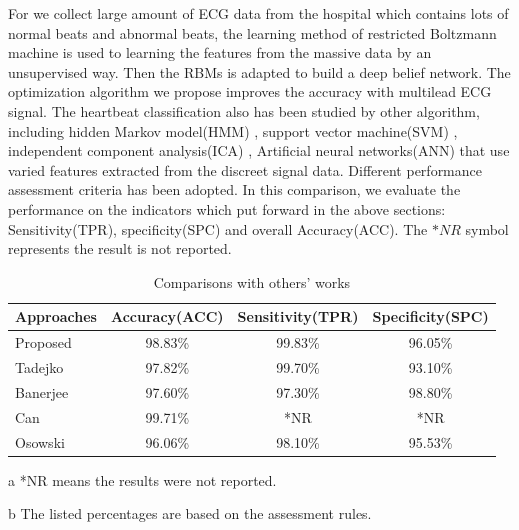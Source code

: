 \documentclass{bmcart}
\begin{document}
For we collect large amount of ECG data from the hospital which contains lots of normal beats and abnormal beats, the learning method of restricted Boltzmann machine is used to learning the features from the massive data by an unsupervised way. Then the RBMs is adapted to build a deep belief network. The optimization algorithm we propose improves the accuracy with multilead ECG signal. The heartbeat classification also has been studied by other algorithm, including hidden Markov model(HMM) \cite{Andreao}, support vector machine(SVM) \cite{Asl}\cite{Melgani}, independent component analysis(ICA) \cite{Sung}, Artificial neural networks(ANN) that use varied features extracted from the discreet signal data. Different performance assessment criteria has been adopted. In this comparison, we evaluate the performance on the indicators which put forward in the above sections: Sensitivity(TPR), specificity(SPC) and overall Accuracy(ACC). The $*NR$ symbol represents the result is not reported. 

\begin{table}[!htbp]
\small
\begin{center}
\begin{threeparttable}
\caption{Comparisons with others' works}
\label{table5}
\begin{tabular}{lccc}
\hline

Approaches            	&  Accuracy(ACC)  & Sensitivity(TPR) & Specificity(SPC)\\
\hline
 Proposed             	&98.83\%   	  & 99.83\%  	 &96.05\%    \\
 Tadejko\cite{Tadejko}	& 97.82\%   	  & 99.70\%     &93.10\%    \\
 Banerjee\cite{Banerjee}&97.60\%  	  & 97.30\%     &98.80\%    \\
 Can\cite{Can}        	&99.71\%  	  & *NR         &*NR      \\
 Osowski\cite{Osowski}	&96.06\%   	  & 98.10\%     &95.53\%    \\
\hline
\end{tabular}
\begin{tablenotes}
\item [a] *NR means the results were not reported.
\item [b] The listed percentages are based on the assessment rules.
\end{tablenotes}
\end{threeparttable}
\end{center}
\end{table}
\end{document}
